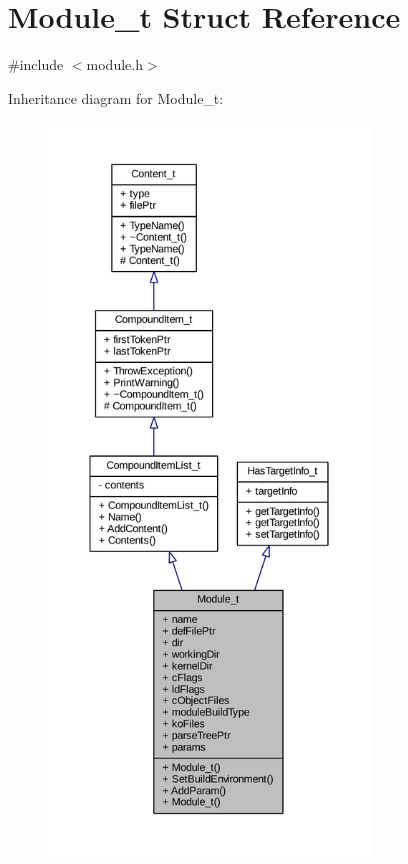 \hypertarget{struct_module__t}{}\section{Module\+\_\+t Struct Reference}
\label{struct_module__t}


{\ttfamily \#include $<$module.\+h$>$}



Inheritance diagram for Module\+\_\+t\+:
\nopagebreak
\begin{figure}[H]
\begin{center}
\leavevmode
\includegraphics[height=550pt]{struct_module__t__inherit__graph}
\end{center}
\end{figure}



